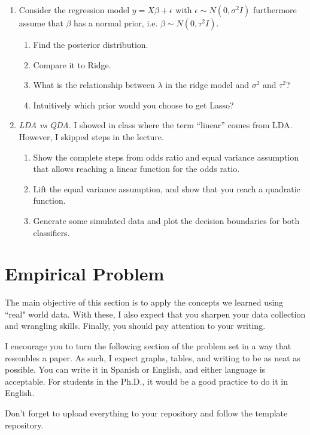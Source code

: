 \documentclass[12pt,onecolumn,A4]{article}
\begin{document}
\begin{enumerate}
\item Consider the regression model $y=X\beta +\epsilon$ with $\epsilon\sim N(0,\sigma^2I)$ furthermore assume that $\beta$ has a normal prior, i.e. $\beta\sim N(0,\tau^2I)$. 
\begin{enumerate}
    \item Find the posterior distribution. 
    \item Compare it to Ridge.
    \item What is the relationship between $\lambda$ in the ridge model and $\sigma^2$ and $\tau^2$?
    \item Intuitively which prior would you choose to get Lasso?
\end{enumerate}


  \item {\it LDA vs QDA}. I showed in class where the term ``linear'' comes from LDA. However, I skipped steps in the lecture. 
  \begin{enumerate}
    \item Show the complete steps from odds ratio and equal variance assumption that allows reaching a linear function for the odds ratio. 
    \item Lift the equal variance assumption, and show that you reach a quadratic function. 
    \item Generate some simulated data and plot the decision boundaries for both classifiers. 
  \end{enumerate}
 
\end{enumerate}


\section{Empirical Problem}

The main objective of this section is to apply the concepts we learned using ``real" world data. With these, I also expect that you sharpen your data collection and wrangling skills. Finally, you should pay attention to your writing.

I encourage you to turn the following section of the problem set in a way that resembles a paper. As such, I expect graphs, tables, and writing to be as neat as possible. You can write it in Spanish or English, and either language is acceptable. For students in the Ph.D., it would be a good practice to do it in English.

Don't forget to upload everything to your repository and follow the template repository. 
\end{document}
